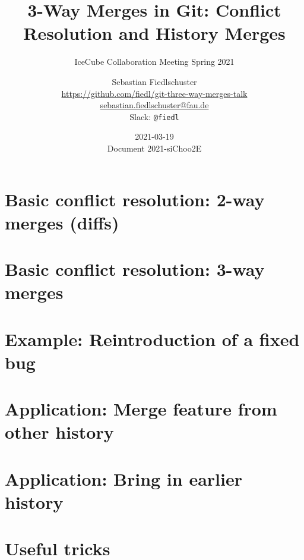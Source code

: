 \documentclass{beamer}
\title{3-Way Merges in Git: Conflict Resolution and History Merges}
\subtitle{IceCube Collaboration Meeting Spring 2021}
\date{2021-03-19 \\ \vspace*{2mm}\tiny{Document 2021-siChoo2E} \normalsize}
\author[Sebastian Fiedlschuster]{Sebastian Fiedlschuster \vspace*{0.5em} \\ \small\url{https://github.com/fiedl/git-three-way-merges-talk} \\
\footnotesize\url{sebastian.fiedlschuster@fau.de} \\
\footnotesize Slack: \texttt{@fiedl}}
\institute{Erlangen Centre for Astroparticle Physics}
\newif\ifplacelogo %
\begin{document}



\placelogofalse

\newcommand\done{\checkmark\xspace}
\newcommand\inprogress{$\Rightarrow$\xspace}
\newcommand\tobedone{$\square$\xspace}

\newcommand\question[1]{\colorbox{blue!10}{\fbox{\ \ \questionicon \ \ #1}}}

\newcommand\relates{$\mathrel{\widehat{=}}$}




\section{Basic conflict resolution: 2-way merges (diffs)}


\section{Basic conflict resolution: 3-way merges}


\section{Example: Reintroduction of a fixed bug}


\section{Application: Merge feature from other history}


\section{Application: Bring in earlier history}


\section{Useful tricks}







\end{document}

